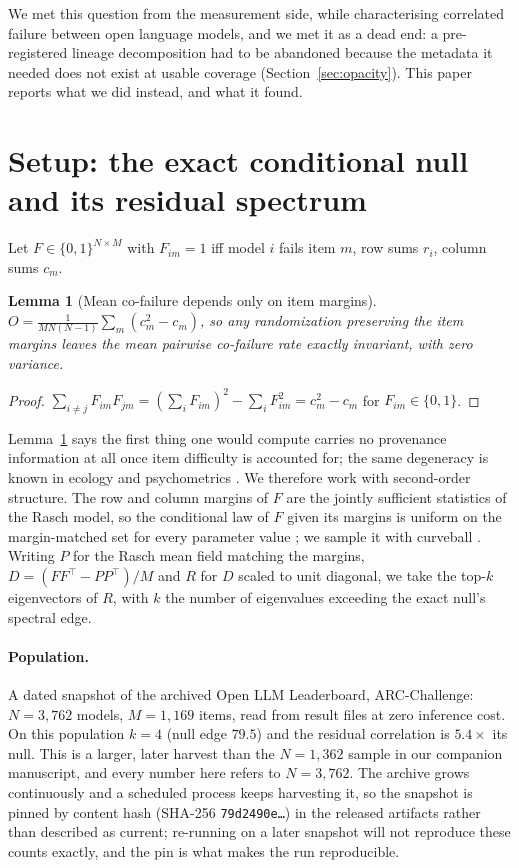 \documentclass{article}
\newtheorem{lemma}{Lemma}
\begin{document}
We met this question from the measurement side, while characterising correlated failure between
open language models, and we met it as a dead end: a pre-registered lineage decomposition had to be
abandoned because the metadata it needed does not exist at usable coverage
(Section~\ref{sec:opacity}). This paper reports what we did instead, and what it found.

\section{Setup: the exact conditional null and its residual spectrum}

Let $F\in\{0,1\}^{N\times M}$ with $F_{im}=1$ iff model $i$ fails item $m$, row sums $r_i$, column
sums $c_m$.

\begin{lemma}[Mean co-failure depends only on item margins]
\label{lem:mean}
$O=\frac{1}{MN(N-1)}\sum_m(c_m^2-c_m)$, so any randomization preserving the item margins leaves the
mean pairwise co-failure rate exactly invariant, with zero variance.
\end{lemma}
\begin{proof}
$\sum_{i\neq j}F_{im}F_{jm}=(\sum_i F_{im})^2-\sum_i F_{im}^2=c_m^2-c_m$ for $F_{im}\in\{0,1\}$.
\end{proof}

Lemma~\ref{lem:mean} says the first thing one would compute carries no provenance information at
all once item difficulty is accounted for; the same degeneracy is known in ecology and
psychometrics \citep{schluter1984,gotelli2000,cronbach1951}. We therefore work with second-order
structure. The row and column margins of $F$ are the jointly sufficient statistics of the Rasch
model, so the conditional law of $F$ given its margins is uniform on the margin-matched set for
every parameter value \citep{rasch1960,andersen1973}; we sample it with curveball
\citep{strona2014,carstens2015}. Writing $P$ for the Rasch mean field matching the margins,
$D=(FF^{\!\top}-PP^{\!\top})/M$ and $R$ for $D$ scaled to unit diagonal, we take the top-$k$
eigenvectors of $R$, with $k$ the number of eigenvalues exceeding the exact null's spectral edge.

\paragraph{Population.} A dated snapshot of the archived Open LLM Leaderboard, ARC-Challenge:
$N=3{,}762$ models, $M=1{,}169$ items, read from result files at zero inference cost. On this
population $k=4$ (null edge $79.5$) and the residual correlation is $5.4\times$ its null. This is a
larger, later harvest than the $N=1{,}362$ sample in our companion manuscript, and every number
here refers to $N=3{,}762$. The archive grows continuously and a scheduled process keeps harvesting
it, so the snapshot is pinned by content hash (SHA-256 \texttt{79d2490e\ldots}) in the released
artifacts rather than described as current; re-running on a later snapshot will not reproduce these
counts exactly, and the pin is what makes the run reproducible.
\end{document}

